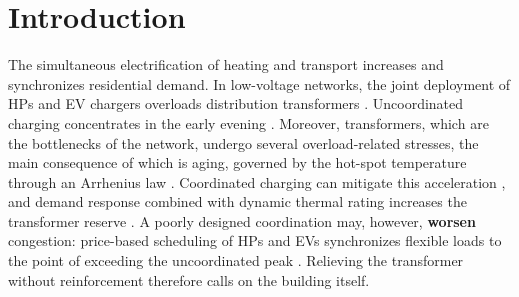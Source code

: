 \documentclass[conference]{IEEEtran}
\begin{document}
\par{}\par\smallskip

\section{\textbf{Introduction}}

The simultaneous electrification of heating and transport increases and synchronizes residential demand. In low-voltage networks, the joint deployment of HPs and EV chargers overloads distribution transformers \cite{NavarroEspinosa2016}. Uncoordinated charging concentrates in the early evening \cite{Muratori2018}. Moreover, transformers, which are the bottlenecks of the network, undergo several overload-related stresses, the main consequence of which is aging, governed by the hot-spot temperature through an Arrhenius law \cite{IEEEC5791_2025, IEC60076_7_2018}. Coordinated charging can mitigate this acceleration \cite{Hilshey2013}, and demand response combined with dynamic thermal rating increases the transformer reserve \cite{Daminov2021}. A poorly designed coordination may, however, \textbf{worsen} congestion: price-based scheduling of HPs and EVs synchronizes flexible loads to the point of exceeding the uncoordinated peak \cite{Hein2026}. Relieving the transformer without reinforcement therefore calls on the building itself.
\end{document}
